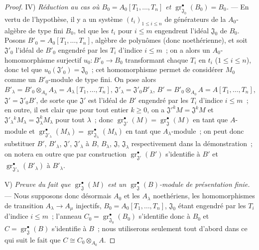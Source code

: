 \begin{proof}
\medskip
\noindent IV) \emph{Réduction au cas où
$B_0=A_0[T_1,\ldots,T_n]$ et
$\operatorname{gr}_{\mathfrak J_0}^\bullet(B_0)=B_0$.} --- En vertu de l'hypothèse,
il y a un système $(t_i)_{1\leq i\leq n}$ de générateurs de la $A_0$-algèbre
de type fini $B_0$, tel que les $t_i$ pour $i\leq m$ engendrent l'idéal
$\mathfrak J_0$ de $B_0$. Posons $B'_0=A_0[T_1,\ldots,T_n]$,
algèbre de polynômes (donc noethérienne), et soit $\mathfrak J'_0$ l'idéal de
$B'_0$ engendré par les $T_i$ d'indice $i\leq m$~; on a alors un
$A_0$-homomorphisme surjectif $u_0:B'_0\to B_0$ transformant chaque $T_i$ en
$t_i$ ($1\leq i\leq n$), donc tel que $u_0(\mathfrak J'_0)=\mathfrak J_0$~;
cet homomorphisme permet de considérer $M_0$ comme un $B'_0$-module de type
fini. On pose alors
$B'_\lambda=B'_0\otimes_{A_0}A_\lambda
=A_\lambda[T_1,\ldots,T_n]$, $\mathfrak J'_\lambda=\mathfrak J'_0B'_\lambda$,
$B'=B'_0\otimes_{A_0}A=A[T_1,\ldots,T_n]$, $\mathfrak J'=\mathfrak J'_0B'$,
de sorte que $\mathfrak J'$ est l'idéal de $B'$ engendré par les $T_i$
d'indice $i\leq m$~; en outre, il est clair que pour tout entier $k\geq0$,
on a $\mathfrak J'^kM=\mathfrak J^kM$ et
$\mathfrak J'_\lambda{}^kM_\lambda=\mathfrak J_\lambda^kM_\lambda$ pour tout
$\lambda$~; donc
$\operatorname{gr}_{\mathfrak J'}^\bullet(M)=\operatorname{gr}_{\mathfrak J}^\bullet(M)$
en tant que $A$-module et
$\operatorname{gr}_{\mathfrak J'_\lambda}^\bullet(M_\lambda)
=\operatorname{gr}_{\mathfrak J_\lambda}^\bullet(M_\lambda)$ en tant que
$A_\lambda$-module~; on peut donc substituer $B'$, $B'_\lambda$,
$\mathfrak J'$, $\mathfrak J'_\lambda$ à $B$, $B_\lambda$, $\mathfrak J$,
$\mathfrak J_\lambda$ respectivement dans la démonstration~; on notera en
outre que par construction $\operatorname{gr}_{\mathfrak J'}^\bullet(B')$
s'identifie à $B'$ et $\operatorname{gr}_{\mathfrak J'_\lambda}^\bullet(B'_\lambda)$
à $B'_\lambda$.

\medskip
\noindent V) \emph{Preuve du fait que
$\operatorname{gr}_{\mathfrak J}^\bullet(M)$ est un
$\operatorname{gr}_{\mathfrak J}^\bullet(B)$-module de présentation finie.} --- Nous
supposons donc désormais $A_0$ et les $A_\lambda$ noethériens, les
homomorphismes de transition $A_\lambda\to A_\mu$ injectifs,
$B_0=A_0[T_1,\ldots,T_n]$, $\mathfrak J_0$ étant engendré par les $T_i$
d'indice $i\leq m$~; l'anneau
$C_0=\operatorname{gr}_{\mathfrak J_0}^\bullet(B_0)$ s'identifie donc à $B_0$ et
$C=\operatorname{gr}_{\mathfrak J}^\bullet(B)$ s'identifie à $B$~; nous utiliserons
seulement tout d'abord dans ce qui suit le fait que
$C\cong C_0\otimes_{A_0}A$.


\end{proof}
